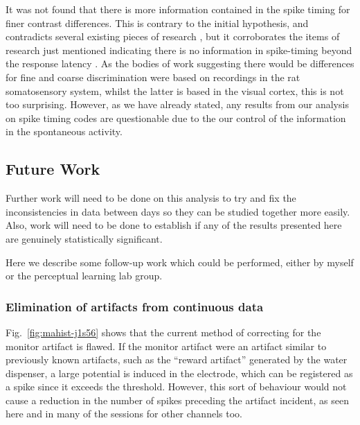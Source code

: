 It was not found that there is more information contained in the spike timing for finer contrast differences. This is contrary to the initial hypothesis, and contradicts several existing pieces of research \cite{Reich2001,Arabzadeh2006}, but it corroborates the items of research just mentioned indicating there is no information in spike-timing beyond the response latency \cite{Reich2001,Tovee1993,Rolls2011}.
As the bodies of work suggesting there would be differences for fine and coarse discrimination were based on recordings in the rat somatosensory system, whilst the latter is based in the visual cortex, this is not too surprising.
However, as we have already stated, any results from our analysis on spike timing codes are questionable due to the our control of the information in the spontaneous activity.

\subsection{Future Work}

Further work will need to be done on this analysis to try and fix the inconsistencies in data between days so they can be studied together more easily. Also, work will need to be done to establish if any of the results presented here are genuinely statistically significant.

Here we describe some follow-up work which could be performed, either by myself or the perceptual learning lab group.

\subsubsection{Elimination of artifacts from continuous data}

Fig.~\ref{fig:mahist-j1s56} shows that the current method of correcting for the monitor artifact is flawed.
If the monitor artifact were an artifact similar to previously known artifacts, such as the ``reward artifact'' generated by the water dispenser, a large potential is induced in the electrode, which can be registered as a spike since it exceeds the threshold. However, this sort of behaviour would not cause a reduction in the number of spikes preceding the artifact incident, as seen here and in many of the sessions for other channels too.

